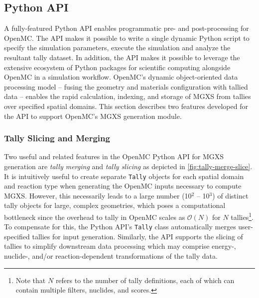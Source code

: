 \subsection{Python API}
\label{subsec:pyapi}

A fully-featured Python API enables programmatic pre- and post-processing for OpenMC\cite{boyd2016bigdata}. The API makes it possible to write a single dynamic Python script to specify the simulation parameters, execute the simulation and analyze the resultant tally dataset. In addition, the API makes it possible to leverage the extensive ecosystem of Python packages for scientific computing alongside OpenMC in a simulation workflow. OpenMC's dynamic object-oriented data processing model -- fusing the geometry and materials configuration with tallied data -- enables the rapid calculation, indexing, and storage of MGXS from tallies over specified spatial domains. This section describes two features developed for the API to support OpenMC's MGXS generation module.


\subsubsection{Tally Slicing and Merging}
\label{subsubsec:tally-slice-merge}

Two useful and related features in the OpenMC Python API for MGXS generation are \emph{tally merging} and \emph{tally slicing} as depicted in \cref{fig:tally-merge-slice}. It is intuitively useful to create separate \texttt{Tally} objects for each spatial domain and reaction type when generating the OpenMC inputs necessary to compute MGXS. However, this necessarily leads to a large number (10$^2$ -- 10$^3$) of distinct tally objects for large, complex geometries, which poses a computational bottleneck since the overhead to tally in OpenMC scales as $\mathcal{O}(N)$ for $N$ tallies\footnote{Note that $N$ refers to the number of tally definitions, each of which can contain multiple filters, nuclides, and scores.}. To compensate for this, the Python API's \texttt{Tally} class automatically merges user-specified tallies for input generation. Similarly, the API supports the slicing of tallies to simplify downstream data processing which may comprise energy-, nuclide-, and/or reaction-dependent transformations of the tally data. 


